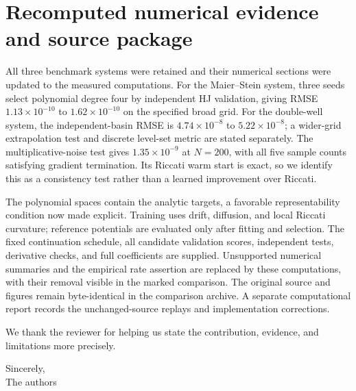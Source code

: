 \documentclass[11pt]{article}
\begin{document}
\section*{Recomputed numerical evidence and source package}
All three benchmark systems were retained and their numerical sections were updated to the measured computations. For the Maier--Stein system, three seeds select polynomial degree four by independent HJ validation, giving RMSE $1.13\times10^{-10}$ to $1.62\times10^{-10}$ on the specified broad grid. For the double-well system, the independent-basin RMSE is $4.74\times10^{-8}$ to $5.22\times10^{-8}$; a wider-grid extrapolation test and discrete level-set metric are stated separately. The multiplicative-noise test gives $1.35\times10^{-9}$ at $N=200$, with all five sample counts satisfying gradient termination. Its Riccati warm start is exact, so we identify this as a consistency test rather than a learned improvement over Riccati.

The polynomial spaces contain the analytic targets, a favorable representability condition now made explicit. Training uses drift, diffusion, and local Riccati curvature; reference potentials are evaluated only after fitting and selection. The fixed continuation schedule, all candidate validation scores, independent tests, derivative checks, and full coefficients are supplied. Unsupported numerical summaries and the empirical rate assertion are replaced by these computations, with their removal visible in the marked comparison. The original source and figures remain byte-identical in the comparison archive. A separate computational report records the unchanged-source replays and implementation corrections.

We thank the reviewer for helping us state the contribution, evidence, and limitations more precisely.

Sincerely,\\The authors
\end{document}
